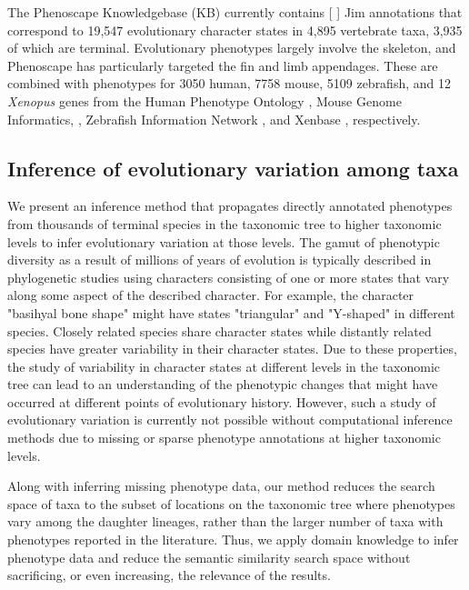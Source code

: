 \documentclass{article}
\begin{document}
The Phenoscape Knowledgebase (KB) currently contains [ ] Jim  annotations that correspond to 19,547 evolutionary character states in 4,895 vertebrate taxa, 3,935 of which are terminal. Evolutionary phenotypes largely involve the skeleton, and Phenoscape has particularly targeted the fin and limb appendages. These are combined with phenotypes for 3050 human, 7758 mouse, 5109 zebrafish, and 12 \textit{Xenopus} genes from the Human Phenotype Ontology \cite{kohler2013human}, Mouse Genome Informatics, \cite{eppig2015mouse}, Zebrafish Information Network \cite{bradford2011zfin}, and Xenbase \cite{karpinka2015xenbase}, respectively.  





\subsection{Inference of evolutionary variation among taxa}
We present an inference method that propagates directly annotated phenotypes from thousands of terminal species in the taxonomic tree to higher taxonomic levels to infer evolutionary variation at those levels. The gamut of phenotypic diversity as a result of millions of years of evolution is typically described in phylogenetic studies using characters consisting of one or more states that vary along some aspect of the described character. For example, the character "basihyal bone shape" might have states "triangular" and "Y-shaped" in different species. Closely related species share character states while distantly related species have greater variability in their character states. Due to these properties, the study of variability in character states at different levels in the taxonomic tree can lead to an understanding of the phenotypic changes that might have occurred at different points of evolutionary history. However, such a study of evolutionary variation is currently not possible without computational inference methods due to missing or sparse phenotype annotations at higher taxonomic levels.  

Along with inferring missing phenotype data, our method reduces the search space of taxa to the subset of locations on the taxonomic tree where phenotypes vary among the daughter lineages, rather than the larger number of taxa with phenotypes reported in the literature. Thus, we apply domain knowledge to infer phenotype data and reduce the semantic similarity search space without sacrificing, or even increasing, the relevance of the results.
\end{document}
